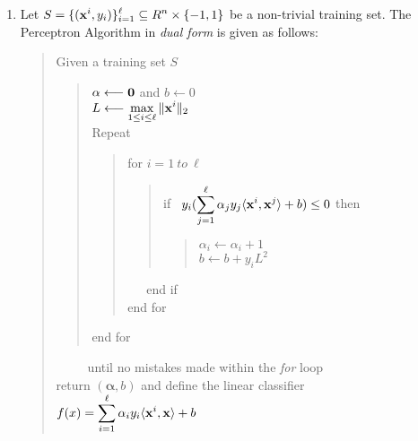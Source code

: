 \documentclass[12pt]{article}
\begin{document}
\begin{enumerate}
\item
Let $\displaystyle{S=\{({\bf x}^i, y_i)\}_{i=1}^\ell \subseteq R^n
\times \{-1,1\}}$ be a non-trivial training set. The Perceptron
Algorithm in {\em dual form} is given as follows:
\begin{verse}
Given a training set $S$ \\
\begin{verse}
${\bf \alpha} \longleftarrow {\bf 0}$ and $b \longleftarrow 0$ \\ 
$L \longleftarrow \displaystyle{\max_{1 \le i \le \ell} \|{\bf x}^i\|_2}$ \\
Repeat
\begin{verse}
for $i=1 \ to \  \ell$\\
\begin{verse}
if \ $\displaystyle{y_i(\sum_{j=1}^\ell \alpha_jy_j\langle {\bf x}^i,
{\bf x}^j \rangle +b)} \le 0$ then \\
\begin{verse}
$\alpha_i \longleftarrow \alpha_i +1$ \\
$b \longleftarrow b+y_iL^2$
\end{verse}
\end{verse}
\  \ \  end if\\
end for
\end{verse}
end for
\end{verse}
\ \ \ \ \ until no mistakes made within the {\em for} loop \\
return $({\mathbf \alpha}, b)$ and define the linear classifier\\
$\displaystyle{f(x)= \sum_{i=1}^\ell \alpha_i y_i\langle {\bf x}^i,
{\bf x} \rangle +b}$
\end{verse}


\end{enumerate}
\end{document}
